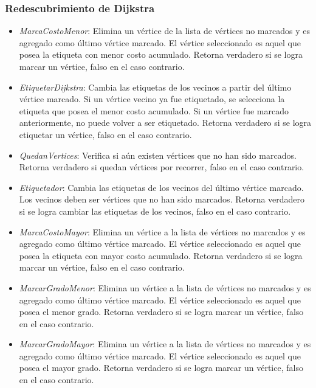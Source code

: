 \subsubsection*{Redescubrimiento de Dijkstra}

\begin{itemize}

\item \textit{MarcaCostoMenor}: Elimina un vértice de la lista de vértices no marcados y es agregado como último vértice marcado. El vértice seleccionado es aquel que posea la etiqueta con menor costo acumulado. Retorna verdadero si se logra marcar un vértice, falso en el caso contrario.

\item \textit{EtiquetarDijkstra}: Cambia las etiquetas de los vecinos a partir del último vértice marcado. Si un vértice vecino ya fue etiquetado, se selecciona la etiqueta que posea el menor costo acumulado. Si un vértice fue marcado anteriormente, no puede volver a ser etiquetado. Retorna verdadero si se logra etiquetar un vértice, falso en el caso contrario.

\item \textit{QuedanVertices}: Verifica si aún existen vértices que no han sido marcados. Retorna verdadero si quedan vértices por recorrer, falso en el caso contrario.

\item \textit{Etiquetador}: Cambia las etiquetas de los vecinos del último vértice marcado. Los vecinos deben ser vértices que no han sido marcados. Retorna verdadero si se logra cambiar las etiquetas de los vecinos, falso en el caso contrario.

\item \textit{MarcaCostoMayor}: Elimina un vértice a la lista de vértices no marcados y es agregado como último vértice marcado. El vértice seleccionado es aquel que posea la etiqueta con mayor costo acumulado. Retorna verdadero si se logra marcar un vértice, falso en el caso contrario.

\item \textit{MarcarGradoMenor}: Elimina un vértice a la lista de vértices no marcados y es agregado como último vértice marcado. El vértice seleccionado es aquel que posea el menor grado. Retorna verdadero si se logra marcar un vértice, falso en el caso contrario.

\item \textit{MarcarGradoMayor}: Elimina un vértice a la lista de vértices no marcados y es agregado como último vértice marcado. El vértice seleccionado es aquel que posea el mayor grado. Retorna verdadero si se logra marcar un vértice, falso en el caso contrario.

\end{itemize}

